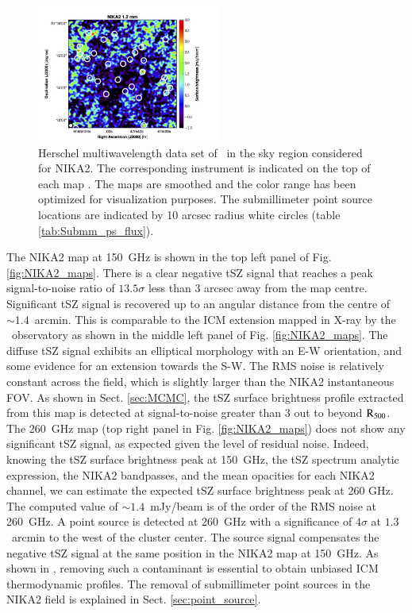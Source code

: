 \documentclass[traditabstract]{aa}
\begin{document}
\begin{figure}[h!]
\includegraphics[height=4.5cm]{NIKA2_1000.jpeg}
\caption{{\footnotesize Herschel multiwavelength data set of \psz\ in the sky region considered for NIKA2. The corresponding instrument is indicated on the top of each map \citep{pog10, gri10}. The maps are smoothed and the color range has been optimized for visualization purposes. The submillimeter point source locations are indicated by 10 arcsec radius white circles (table \ref{tab:Submm_ps_flux}).}}
\label{fig:point_sources}
\end{figure}
\indent The NIKA2 map at 150~GHz is shown in the top left panel of Fig. \ref{fig:NIKA2_maps}. There is a clear negative tSZ signal that reaches a peak signal-to-noise ratio of $13.5\sigma$ less than 3 arcsec away from the map centre. Significant tSZ signal is recovered up to an angular distance from the centre of ${\sim}1.4$~arcmin. This is comparable to the ICM extension mapped in X-ray by the \xmm\ observatory as shown in the middle left panel of Fig. \ref{fig:NIKA2_maps}. The diffuse tSZ signal exhibits an elliptical morphology with an E-W orientation, and some evidence for an extension towards the S-W. The RMS noise is relatively constant across the field, which is slightly larger than the NIKA2 instantaneous FOV. As shown in Sect. \ref{sec:MCMC}, the tSZ surface brightness profile extracted from this map is detected at signal-to-noise greater than 3 out to beyond $\rm{R_{500}}$.\\
\indent The 260~GHz map (top right panel in Fig. \ref{fig:NIKA2_maps}) does not show any significant tSZ signal, as expected given the level of residual noise. Indeed, knowing the tSZ surface brightness peak at 150~GHz, the tSZ spectrum analytic expression, the NIKA2 bandpasses, and the mean opacities for each NIKA2 channel, we can estimate the expected tSZ surface brightness peak at 260 GHz. The computed value of ${\sim}1.4$~mJy/beam is of the order of the RMS noise at 260~GHz. A point source is detected at 260~GHz with a significance of $4\sigma$ at $1.3$~arcmin to the west of the cluster center. The source signal compensates the negative tSZ signal at the same position in the NIKA2 map at 150~GHz. As shown in \citep{ada16a}, removing such a contaminant is essential to obtain unbiased ICM thermodynamic profiles. The removal of submillimeter point sources in the NIKA2 field is explained in Sect. \ref{sec:point_source}.
\end{document}
